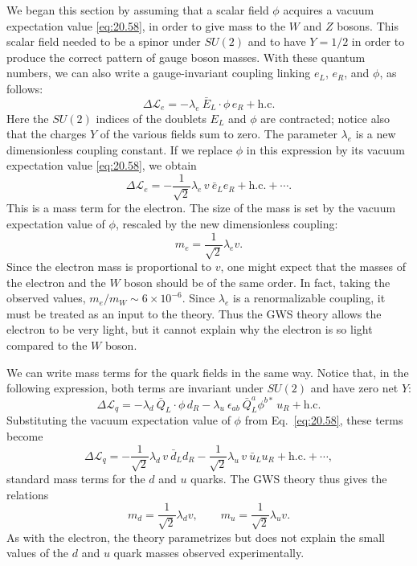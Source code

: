 We began this section by assuming that a scalar field $\phi$ acquires a
vacuum expectation value \eqref{eq:20.58}, in order to give mass to the $W$
and $Z$ bosons.  This scalar field needed to be a spinor under $SU(2)$ and to
have $Y = 1/2$ in order to produce the correct pattern of gauge boson masses.
With these quantum numbers, we can also write a gauge-invariant coupling
linking $e_L$, $e_R$, and $\phi$, as follows:
\begin{equation}
  \Delta\mathcal{L}_e = -\lambda_e\ \bar{E}_L\cdot\phi\,e_R + \mathrm{h.c.}
  \label{eq:20.98}
\end{equation}
Here the $SU(2)$ indices of the doublets $E_L$ and $\phi$ are contracted;
notice also that the charges $Y$ of the various fields sum to zero.  The
parameter $\lambda_e$ is a new dimensionless coupling constant.  If we replace
$\phi$ in this expression by its vacuum expectation value \eqref{eq:20.58}, we
obtain
\begin{equation}
  \Delta\mathcal{L}_e = -\frac{1}{\sqrt{2}}\lambda_e\,v\ \bar{e}_Le_R
    + \mathrm{h.c.} + \cdots .
  \label{eq:20.99}
\end{equation}
This is a mass term for the electron.  The size of the mass is set by the
vacuum expectation value of $\phi$, rescaled by the new dimensionless
coupling:
\begin{equation}
  m_e = \frac{1}{\sqrt{2}}\lambda_e v .
  \label{eq:20.100}
\end{equation}
Since the electron mass is proportional to $v$, one might expect that the
masses of the electron and the $W$ boson should be of the same order.  In
fact, taking the observed values, $m_e/m_W \sim 6\times10^{-6}$.  Since
$\lambda_e$ is a renormalizable coupling, it must be treated as an input to
the theory.  Thus the GWS theory allows the electron to be very light, but it
cannot explain why the electron is so light compared to the $W$ boson.

We can write mass terms for the quark fields in the same way.  Notice that,
in the following expression, both terms are invariant under $SU(2)$ and have
zero net $Y$:
\begin{equation}
  \Delta\mathcal{L}_q = -\lambda_d\ \bar{Q}_L\cdot\phi\,d_R
    - \lambda_u\ \epsilon_{ab}\ \bar{Q}^a_L\phi^{b*}\,u_R + \mathrm{h.c.}
  \label{eq:20.101}
\end{equation}
Substituting the vacuum expectation value of $\phi$ from Eq.~\eqref{eq:20.58},
these terms become
\begin{equation}
  \Delta\mathcal{L}_q = -\frac{1}{\sqrt{2}}\lambda_d\,v\ \bar{d}_Ld_R
    - \frac{1}{\sqrt{2}}\lambda_u\,v\ \bar{u}_Lu_R + \mathrm{h.c.} + \cdots ,
  \label{eq:20.102}
\end{equation}
standard mass terms for the $d$ and $u$ quarks.  The GWS theory thus gives the
relations
\begin{equation}
  m_d = \frac{1}{\sqrt{2}}\lambda_d v,\qquad
  m_u = \frac{1}{\sqrt{2}}\lambda_u v .
  \label{eq:20.103}
\end{equation}
As with the electron, the theory parametrizes but does not explain the small
values of the $d$ and $u$ quark masses observed experimentally.

